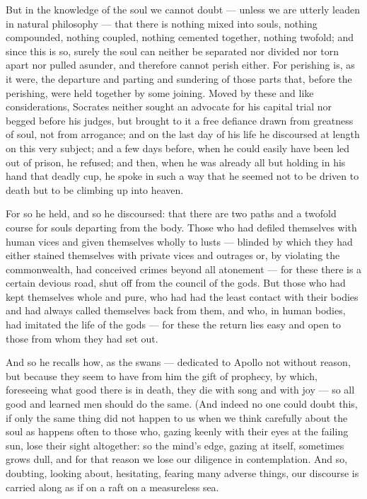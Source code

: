 But in the knowledge of the soul we cannot doubt — unless we are utterly leaden in natural philosophy — that there is nothing mixed into souls, nothing compounded, nothing coupled, nothing cemented together, nothing twofold; and since this is so, surely the soul can neither be separated nor divided nor torn apart nor pulled asunder, and therefore cannot perish either. For perishing is, as it were, the departure and parting and sundering of those parts that, before the perishing, were held together by some joining. Moved by these and like considerations, Socrates neither sought an advocate for his capital trial nor begged before his judges, but brought to it a free defiance drawn from greatness of soul, not from arrogance; and on the last day of his life he discoursed at length on this very subject; and a few days before, when he could easily have been led out of prison, he refused; and then, when he was already all but holding in his hand that deadly cup, he spoke in such a way that he seemed not to be driven to death but to be climbing up into heaven.

 For so he held, and so he discoursed: that there are two paths and a twofold course for souls departing from the body. Those who had defiled themselves with human vices and given themselves wholly to lusts — blinded by which they had either stained themselves with private vices and outrages or, by violating the commonwealth, had conceived crimes beyond all atonement — for these there is a certain devious road, shut off from the council of the gods. But those who had kept themselves whole and pure, who had had the least contact with their bodies and had always called themselves back from them, and who, in human bodies, had imitated the life of the gods — for these the return lies easy and open to those from whom they had set out.

 And so he recalls how, as the swans — dedicated to Apollo not without reason, but because they seem to have from him the gift of prophecy, by which, foreseeing what good there is in death, they die with song and with joy — so all good and learned men should do the same. (And indeed no one could doubt this, if only the same thing did not happen to us when we think carefully about the soul as happens often to those who, gazing keenly with their eyes at the failing sun, lose their sight altogether: so the mind's edge, gazing at itself, sometimes grows dull, and for that reason we lose our diligence in contemplation. And so, doubting, looking about, hesitating, fearing many adverse things, our discourse is carried along as if on a raft on a measureless sea.

